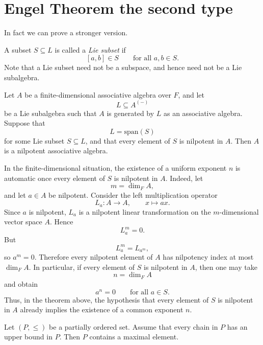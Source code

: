 \section{Engel Theorem the second type}

In fact we can prove a stronger version.

\begin{definition}
    A subset $S\subseteq L$ is called a \emph{Lie subset} if
    \[
        [a,b]\in S
        \qquad
        \text{for all } a,b\in S.
    \]
    Note that a Lie subset need not be a subspace, and hence need not be a Lie subalgebra.
\end{definition}

\begin{theorem}
    Let $A$ be a finite-dimensional associative algebra over $F$, and let
    \[
        L\subseteq A^{(-)}
    \]
    be a Lie subalgebra such that $A$ is generated by $L$ as an associative algebra. Suppose that
    \[
        L=\mathrm{span}(S)
    \]
    for some Lie subset $S\subseteq L$, and that every element of $S$ is nilpotent in $A$. Then $A$ is a nilpotent associative algebra.
\end{theorem}

\begin{remark}
    In the finite-dimensional situation, the existence of a uniform exponent $n$ is automatic once every element of $S$ is nilpotent in $A$. Indeed, let
    \[
        m=\dim_F A,
    \]
    and let $a\in A$ be nilpotent. Consider the left multiplication operator
    \[
        L_a:A\to A,\qquad x\mapsto ax.
    \]
    Since $a$ is nilpotent, $L_a$ is a nilpotent linear transformation on the $m$-dimensional vector space $A$. Hence
    \[
        L_a^m=0.
    \]
    But
    \[
        L_a^m=L_{a^m},
    \]
    so $a^m=0$. Therefore every nilpotent element of $A$ has nilpotency index at most $\dim_F A$. In particular, if every element of $S$ is nilpotent in $A$, then one may take
    \[
        n=\dim_F A
    \]
    and obtain
    \[
        a^n=0
        \qquad
        \text{for all } a\in S.
    \]
    Thus, in the theorem above, the hypothesis that every element of $S$ is nilpotent in $A$ already implies the existence of a common exponent $n$.
\end{remark}

\begin{theorem}
    Let $(P,\leq)$ be a partially ordered set. Assume that every chain in $P$ has an upper bound in $P$. Then $P$ contains a maximal element.
\end{theorem}

